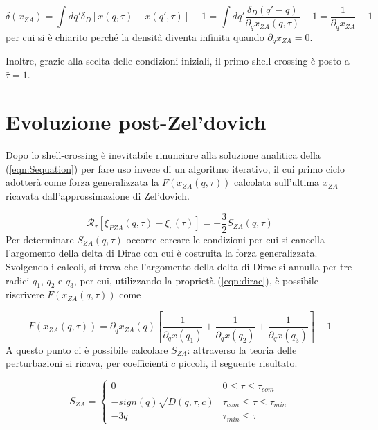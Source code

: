 \begin{equation}
    \label{eqn:density_ZA}
    \delta(x_{ZA})= \int dq' \delta_D[x(q, \tau) - x(q', \tau)] - 1 = \int dq' \frac{\delta_D(q' - q)}{\partial_q x_{ZA}(q, \tau)} - 1 = \frac{1}{\partial_q x_{ZA}}-1
\end{equation}
per cui si è chiarito perché la densità diventa infinita quando $\partial_q x_{ZA} = 0$.

Inoltre, grazie alla scelta delle condizioni iniziali, il primo shell crossing è posto a $\bar{\tau}=1$.


\section{Evoluzione post-Zel'dovich}

Dopo lo shell-crossing è inevitabile rinunciare alla soluzione analitica della (\ref{eqn:Sequation}) per 
fare uso invece di un algoritmo iterativo, il cui primo ciclo adotterà come forza generalizzata la
$F(x_{ZA}(q, \tau))$ calcolata sull'ultima $x_{ZA}$ ricavata dall'approssimazione di Zel'dovich.

\begin{equation}
    \mathcal{R}_{\tau}[\xi_{PZA}(q, \tau)-\xi_c(\tau)] = -\frac{3}{2}S_{ZA}(q, \tau)
\end{equation}
Per determinare $S_{ZA}(q, \tau)$ occorre cercare le condizioni per cui si cancella l'argomento 
della delta di Dirac con cui è costruita la forza generalizzata. Svolgendo i calcoli, si trova
che l'argomento della delta di Dirac si annulla per tre radici $q_1$, $q_2$ e $q_3$, per cui, 
utilizzando la proprietà (\ref{eqn:dirac}), è possibile riscrivere $F(x_{ZA}(q, \tau))$ come

\begin{equation}
    F(x_{ZA}(q, \tau)) = \partial_q x_{ZA}(q)\left[\frac{1}{\partial_q x(q_1)} + \frac{1}{\partial_q x(q_2)} + \frac{1}{\partial_q x(q_3)}\right] - 1
\end{equation}
A questo punto ci è possibile calcolare $S_{ZA}$: attraverso la teoria delle perturbazioni si ricava,
per coefficienti $c$ piccoli, il seguente risultato.

\begin{equation}
    \label{eqn:SZA}
    S_{ZA} = 
    \begin{cases}
        0 & 0 \leq \tau \leq \tau_{com} \\
        -sign(q)\sqrt{D(q, \tau, c)} & \tau_{com} \leq \tau \leq \tau_{min} \\
        -3q & \tau_{min} \leq \tau
    \end{cases}
\end{equation}


